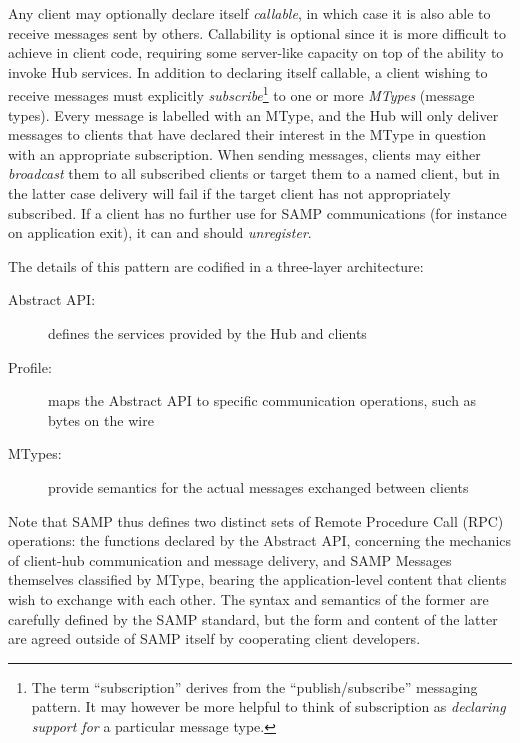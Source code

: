 \documentclass[5p]{elsarticle}
\begin{document}
Any client may optionally declare itself {\em callable\/},
in which case it is also able to receive messages sent by others.
Callability is optional since it is more difficult to
achieve in client code, requiring some server-like capacity
on top of the ability to invoke Hub services.
In addition to declaring itself callable, a client wishing to
receive messages must explicitly {\em subscribe}\footnote{
   The term ``subscription'' derives from the ``publish/subscribe''
   messaging pattern.  It may however be more helpful to think of
   subscription as {\em declaring support for\/} a particular message type.
}
to one or more {\em MTypes} (message types).
Every message is labelled with an MType,
and the Hub will only deliver messages to clients
that have declared their interest in the MType in question with
an appropriate subscription.  When sending messages, clients may
either {\em broadcast\/} them to all subscribed clients or
target them to a named client, but in the latter case delivery
will fail if the target client has not appropriately subscribed.
If a client has no further use for SAMP communications
(for instance on application exit), it can and should {\em unregister\/}.

The details of this pattern are codified in a three-layer architecture:
\begin{description}
\item[Abstract API:] defines the services provided by the Hub and clients
\item[Profile:] maps the Abstract API to specific communication operations,
  such as bytes on the wire
\item[MTypes:] provide semantics for the actual messages exchanged between
  clients
\end{description}

Note that SAMP thus defines two distinct sets of
Remote Procedure Call (RPC) operations:
the functions declared by the Abstract API,
concerning the mechanics of client-hub communication and message delivery,
and SAMP Messages themselves classified by MType,
bearing the application-level content that clients wish
to exchange with each other.
The syntax and semantics of the former are carefully defined by the
SAMP standard, but the form and content of the latter are
agreed outside of SAMP itself by cooperating client developers.
\end{document}
